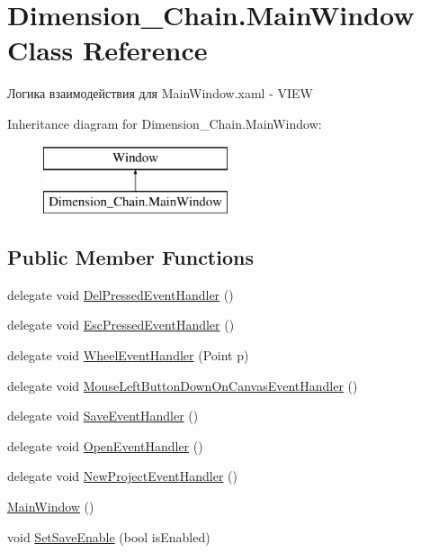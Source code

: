 \hypertarget{class_dimension___chain_1_1_main_window}{}\section{Dimension\+\_\+\+Chain.\+Main\+Window Class Reference}
\label{class_dimension___chain_1_1_main_window}


Логика взаимодействия для Main\+Window.\+xaml -\/ V\+I\+EW  


Inheritance diagram for Dimension\+\_\+\+Chain.\+Main\+Window\+:\begin{figure}[H]
\begin{center}
\leavevmode
\includegraphics[height=2.000000cm]{class_dimension___chain_1_1_main_window}
\end{center}
\end{figure}
\subsection*{Public Member Functions}
\begin{DoxyCompactItemize}
\item 
delegate void \mbox{\hyperlink{class_dimension___chain_1_1_main_window_a34a91a946df99f170f8961d961a1fa8f}{Del\+Pressed\+Event\+Handler}} ()
\item 
delegate void \mbox{\hyperlink{class_dimension___chain_1_1_main_window_acfa98ee5bdb96cc53214007d560dd087}{Esc\+Pressed\+Event\+Handler}} ()
\item 
delegate void \mbox{\hyperlink{class_dimension___chain_1_1_main_window_ad49f6daca6cd98a445ca9d17d46b04ee}{Wheel\+Event\+Handler}} (Point p)
\item 
delegate void \mbox{\hyperlink{class_dimension___chain_1_1_main_window_a8474fa1057f9cae2aa47066564dc69ee}{Mouse\+Left\+Button\+Down\+On\+Canvas\+Event\+Handler}} ()
\item 
delegate void \mbox{\hyperlink{class_dimension___chain_1_1_main_window_a91ca9eba3ad3e48423c7a28f4fa5bcc2}{Save\+Event\+Handler}} ()
\item 
delegate void \mbox{\hyperlink{class_dimension___chain_1_1_main_window_aad640b4de47e0ac6ac018cc8e612a792}{Open\+Event\+Handler}} ()
\item 
delegate void \mbox{\hyperlink{class_dimension___chain_1_1_main_window_a973bbb7ae10c9591b950d4b1b5d9eea3}{New\+Project\+Event\+Handler}} ()
\item 
\mbox{\hyperlink{class_dimension___chain_1_1_main_window_a0ebc5549460f612ea2a5072bf25e5178}{Main\+Window}} ()
\item 
void \mbox{\hyperlink{class_dimension___chain_1_1_main_window_a77a7bface86a04e6f19dd6071437dd3b}{Set\+Save\+Enable}} (bool is\+Enabled)
\end{DoxyCompactItemize}
